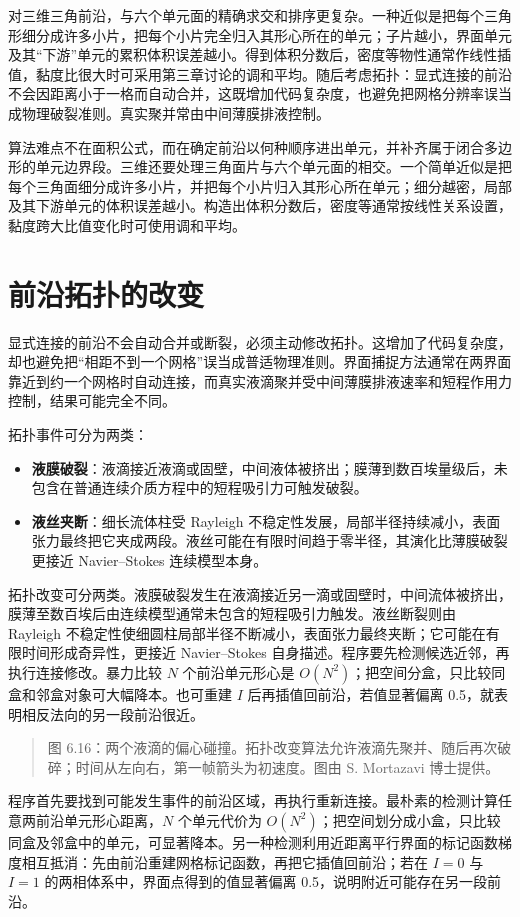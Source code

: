 \documentclass[11pt,a4paper,openany,fontset=none]{ctexbook}
\begin{document}
对三维三角前沿，与六个单元面的精确求交和排序更复杂。一种近似是把每个三角形细分成许多小片，把每个小片完全归入其形心所在的单元；子片越小，界面单元及其“下游”单元的累积体积误差越小。得到体积分数后，密度等物性通常作线性插值，黏度比很大时可采用第三章讨论的调和平均。随后考虑拓扑：显式连接的前沿不会因距离小于一格而自动合并，这既增加代码复杂度，也避免把网格分辨率误当成物理破裂准则。真实聚并常由中间薄膜排液控制。

算法难点不在面积公式，而在确定前沿以何种顺序进出单元，并补齐属于闭合多边形的单元边界段。三维还要处理三角面片与六个单元面的相交。一个简单近似是把每个三角面细分成许多小片，并把每个小片归入其形心所在单元；细分越密，局部及其下游单元的体积误差越小。构造出体积分数后，密度等通常按线性关系设置，黏度跨大比值变化时可使用调和平均。

\section{前沿拓扑的改变}

显式连接的前沿不会自动合并或断裂，必须主动修改拓扑。这增加了代码复杂度，却也避免把“相距不到一个网格”误当成普适物理准则。界面捕捉方法通常在两界面靠近到约一个网格时自动连接，而真实液滴聚并受中间薄膜排液速率和短程作用力控制，结果可能完全不同。

拓扑事件可分为两类：
\begin{itemize}
\item \textbf{液膜破裂}：液滴接近液滴或固壁，中间液体被挤出；膜薄到数百埃量级后，未包含在普通连续介质方程中的短程吸引力可触发破裂。
\item \textbf{液丝夹断}：细长流体柱受 Rayleigh 不稳定性发展，局部半径持续减小，表面张力最终把它夹成两段。液丝可能在有限时间趋于零半径，其演化比薄膜破裂更接近 Navier--Stokes 连续模型本身。
\end{itemize}

拓扑改变可分两类。液膜破裂发生在液滴接近另一滴或固壁时，中间流体被挤出，膜薄至数百埃后由连续模型通常未包含的短程吸引力触发。液丝断裂则由 Rayleigh 不稳定性使细圆柱局部半径不断减小，表面张力最终夹断；它可能在有限时间形成奇异性，更接近 Navier--Stokes 自身描述。程序要先检测候选近邻，再执行连接修改。暴力比较 $N$ 个前沿单元形心是 $O(N^2)$；把空间分盒，只比较同盒和邻盒对象可大幅降本。也可重建 $I$ 后再插值回前沿，若值显著偏离 0.5，就表明相反法向的另一段前沿很近。

\begin{quote}\small 图 6.16：两个液滴的偏心碰撞。拓扑改变算法允许液滴先聚并、随后再次破碎；时间从左向右，第一帧箭头为初速度。图由 S. Mortazavi 博士提供。\end{quote}
程序首先要找到可能发生事件的前沿区域，再执行重新连接。最朴素的检测计算任意两前沿单元形心距离，$N$ 个单元代价为 $O(N^2)$；把空间划分成小盒，只比较同盒及邻盒中的单元，可显著降本。另一种检测利用近距离平行界面的标记函数梯度相互抵消：先由前沿重建网格标记函数，再把它插值回前沿；若在 $I=0$ 与 $I=1$ 的两相体系中，界面点得到的值显著偏离 0.5，说明附近可能存在另一段前沿。
\end{document}
